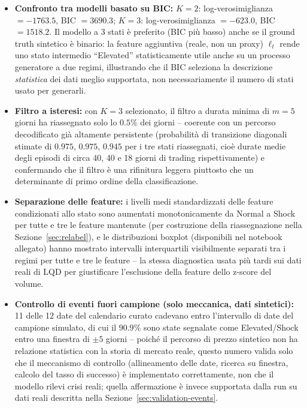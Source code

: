 \documentclass[11pt]{article}
\theoremstyle{definition}
\theoremstyle{remark}
\begin{document}
\begin{itemize}
    \item \textbf{Confronto tra modelli basato su BIC:} $K=2$: log-verosimiglianza $=-1763.5$, BIC $=3690.3$; $K=3$: log-verosimiglianza $=-623.0$, BIC $=1518.2$. Il modello a 3 stati \`e preferito (BIC pi\`u basso) anche se il ground truth sintetico \`e binario: la feature aggiuntiva (reale, non un proxy) $\ell_t$ rende uno stato intermedio ``Elevated'' statisticamente utile anche su un processo generatore a due regimi, illustrando che il BIC seleziona la descrizione \emph{statistica} dei dati meglio supportata, non necessariamente il numero di stati usato per generarli.
    \item \textbf{Filtro a isteresi:} con $K=3$ selezionato, il filtro a durata minima di $m=5$ giorni ha riassegnato solo lo $0.5\%$ dei giorni -- coerente con un percorso decodificato gi\`a altamente persistente (probabilit\`a di transizione diagonali stimate di $0.975$, $0.975$, $0.945$ per i tre stati riassegnati, cio\`e durate medie degli episodi di circa 40, 40 e 18 giorni di trading rispettivamente) e confermando che il filtro \`e una rifinitura leggera piuttosto che un determinante di primo ordine della classificazione.
    \item \textbf{Separazione delle feature:} i livelli medi standardizzati delle feature condizionati allo stato sono aumentati monotonicamente da Normal a Shock per tutte e tre le feature mantenute (per costruzione della riassegnazione nella Sezione~\ref{sec:relabel}), e le distribuzioni boxplot (disponibili nel notebook allegato) hanno mostrato intervalli interquartili visibilmente separati tra i regimi per tutte e tre le feature -- la stessa diagnostica usata pi\`u tardi sui dati reali di LQD per giustificare l'esclusione della feature dello z-score del volume.
    \item \textbf{Controllo di eventi fuori campione (solo meccanica, dati sintetici):} 11 delle 12 date del calendario curato cadevano entro l'intervallo di date del campione simulato, di cui il $90.9\%$ sono state segnalate come Elevated/Shock entro una finestra di $\pm5$ giorni -- poich\'e il percorso di prezzo sintetico non ha relazione statistica con la storia di mercato reale, questo numero valida solo che il meccanismo di controllo (allineamento delle date, ricerca su finestra, calcolo del tasso di successo) \`e implementato correttamente, non che il modello rilevi crisi reali; quella affermazione \`e invece supportata dalla run su dati reali descritta nella Sezione~\ref{sec:validation-events}.
\end{itemize}
\end{document}
